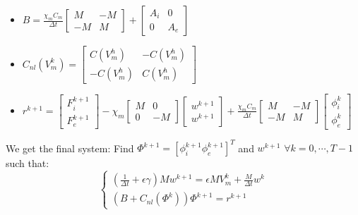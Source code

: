 \documentclass[a4paper,12pt]{article}
\begin{document}
\begin{itemize}
\item $B=\frac{\chi_m C_m}{\Delta t} \begin{bmatrix} M &-M \\-M & M \end{bmatrix}+\begin{bmatrix} A_i & 0 \\ 0 & A_e \end{bmatrix}$
\item $C_{nl}(V_m^k)=\begin{bmatrix}C(V_m^h) & -C(V_m^h) \\ -C(V_m^h) & C(V_m^h) \end{bmatrix}$
\item $r^{k+1}=\begin{bmatrix} F_i^{k+1} \\ F_e^{k+1}\end{bmatrix}-\chi_m \begin{bmatrix}M & 0 \\ 0 & -M \end{bmatrix} \begin{bmatrix}w^{k+1} \\ w^{k+1} \end{bmatrix}+\frac{\chi_m C_m}{\Delta t} \begin{bmatrix} M &-M \\-M & M \end{bmatrix} \begin{bmatrix} \phi_i^k \\ \phi_e^k \end{bmatrix}$
\end{itemize}
We get the final system:\newline
Find $\Phi^{k+1}=[\phi_i^{k+1} \phi_e^{k+1}]^T$ and $w^{k+1}$ $\forall k=0,\cdots,T-1$ such that:
\begin{equation}
\begin{cases}
(\frac{1}{\Delta t}+\epsilon \gamma)M w^{k+1}=\epsilon M V_m^k+\frac{M}{\Delta t} w^k \\
(B+C_{nl}(\Phi^k)) \Phi^{k+1}=r^{k+1}
\end{cases}
\end{equation} 
\end{document}
